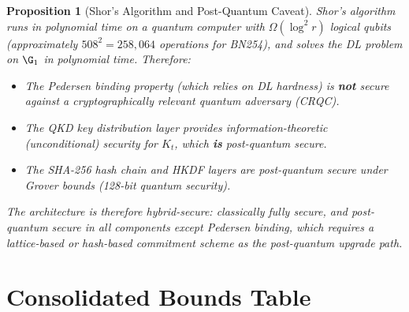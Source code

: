 \documentclass[11pt,letterpaper]{article}
\newtheorem{proposition}{Proposition}[section]
\begin{document}
\begin{proposition}[Shor's Algorithm and Post-Quantum Caveat]\label{prop:shor}
Shor's algorithm runs in polynomial time on a quantum computer with
$\Omega(\log^2 r)$ logical qubits (approximately $508^2 = 258,064$ operations
for BN254), and solves the DL problem on $\G_1$ in polynomial time. Therefore:
\begin{itemize}[noitemsep]
  \item The \emph{Pedersen binding} property (which relies on DL hardness)
        is \textbf{not} secure against a cryptographically relevant
        quantum adversary (CRQC).
  \item The QKD key distribution layer provides information-theoretic
        (unconditional) security for $K_t$, which \textbf{is} post-quantum secure.
  \item The SHA-256 hash chain and HKDF layers are post-quantum secure under
        Grover bounds (128-bit quantum security).
\end{itemize}
The architecture is therefore hybrid-secure: classically fully secure, and
post-quantum secure in all components except Pedersen binding, which requires
a lattice-based or hash-based commitment scheme as the post-quantum upgrade path.
\end{proposition}

\section{Consolidated Bounds Table}
\end{document}
